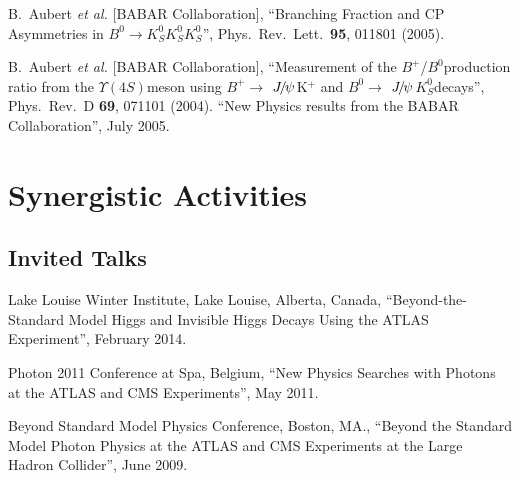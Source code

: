 \documentclass[10pt]{article}
\newcommand{\too}{$\rightarrow$}
\newcommand{\Bz}{$B^0$}
\newcommand{\Bu}{$B^+$}
\newcommand{\KS}{$K^0_{S}$}
\newcommand{\FourS}{$\Upsilon(4S)$}
\newcommand{\jpsi}{$J\mskip -3mu/\mskip -2mu\psi\mskip 2mu$}
\begin{document}
\begin{thebibliography}{99}
 {}B.~Aubert {\it et al.}  [BABAR Collaboration],
``Branching Fraction and CP Asymmetries in \Bz \too \KS \KS \KS'',
  Phys.\ Rev.\ Lett.\  {\bf 95}, 011801 (2005).

 {}B.~Aubert {\it et al.}  [BABAR Collaboration], ``Measurement of the \Bu/\Bz production ratio from the \FourS meson using \Bu $\rightarrow$ \jpsi K$^+$ and \Bz $\to$ \jpsi \KS decays'', {}Phys.\ Rev.\ D {\bf 69}, 071101 (2004).
``New Physics results from the BABAR Collaboration'', July 2005.
\section*{Synergistic Activities}
\renewcommand\refname{\vskip -1.5cm}

\subsection*{Invited Talks}
  Lake Louise Winter Institute, Lake Louise, Alberta, Canada, ``Beyond-the-Standard Model Higgs and Invisible Higgs Decays Using the ATLAS Experiment'', February 2014.

  Photon 2011 Conference at Spa, Belgium, ``New Physics Searches with Photons at the ATLAS and CMS Experiments'', May 2011.



  Beyond Standard Model Physics Conference,  Boston, MA., ``Beyond the Standard Model Photon Physics at the ATLAS and CMS Experiments at the Large Hadron Collider'', June 2009.


\end{thebibliography}
\end{document}
